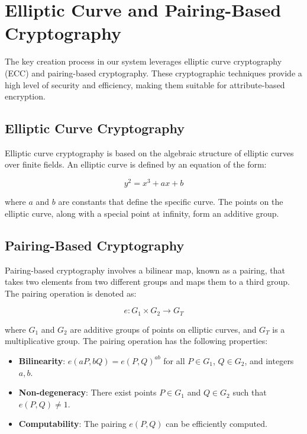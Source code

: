 \documentclass[cic,tc,english]{iiufrgs}
\begin{document}
    \section{Elliptic Curve and Pairing-Based Cryptography}

    The key creation process in our system leverages elliptic curve cryptography (ECC) and pairing-based cryptography. These cryptographic techniques provide a high level of security and efficiency, making them suitable for attribute-based encryption.

    \subsection{Elliptic Curve Cryptography}

    Elliptic curve cryptography is based on the algebraic structure of elliptic curves over finite fields. An elliptic curve is defined by an equation of the form:

    \begin{equation}
    y^2 = x^3 + ax + b
    \end{equation}

    where \(a\) and \(b\) are constants that define the specific curve. The points on the elliptic curve, along with a special point at infinity, form an additive group.

    \subsection{Pairing-Based Cryptography}

    Pairing-based cryptography involves a bilinear map, known as a pairing, that takes two elements from two different groups and maps them to a third group. The pairing operation is denoted as:

    \begin{equation}
    e: G_1 \times G_2 \rightarrow G_T
    \end{equation}

    where \(G_1\) and \(G_2\) are additive groups of points on elliptic curves, and \(G_T\) is a multiplicative group. The pairing operation has the following properties:

    \begin{itemize}
        \item \textbf{Bilinearity}: \(e(aP, bQ) = e(P, Q)^{ab}\) for all \(P \in G_1\), \(Q \in G_2\), and integers \(a, b\).
        \item \textbf{Non-degeneracy}: There exist points \(P \in G_1\) and \(Q \in G_2\) such that \(e(P, Q) \neq 1\).
        \item \textbf{Computability}: The pairing \(e(P, Q)\) can be efficiently computed.
    \end{itemize}        
    
\end{document}
